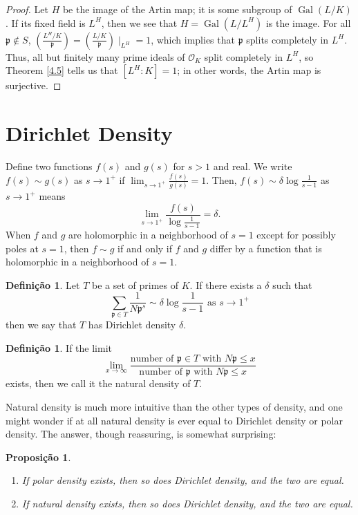 \documentclass{article}
\DeclareMathOperator{\Gal}{Gal}
\theoremstyle{plain}
\newtheorem{prop}[thm]{Proposição}
\theoremstyle{definition}
\newtheorem{defn}[thm]{Definição}
\theoremstyle{remark}
\numberwithin{equation}{section}
\numberwithin{thm}{section}
\begin{document}
\begin{proof}
Let $H$ be the image of the Artin map; it is some subgroup of $\Gal(L/K)$. If its fixed field is $L^{H}$, then we see that $H = \Gal(L/L^{H})$ is the image. For all $\mathfrak{p} \not\in S$, $\left(\frac{L^{H}/K}{\mathfrak{p}}\right) = \left(\frac{L/K}{\mathfrak{p}}\right) \mid_{L^{H}} = 1$, which implies that $\mathfrak{p}$ splits completely in $L^{H}$. Thus, all but finitely many prime ideals of $\mathcal{O}_K$ split completely in $L^{H}$, so Theorem \ref{4.5} tells us that $[L^{H} : K] = 1$; in other words, the Artin map is surjective. 
\end{proof}


\section{Dirichlet Density}

Define two functions $f(s)$ and $g(s)$ for $s > 1$ and real. We write $f(s) \sim g(s)$ as $s \to 1^{+}$ if $\lim_{s \to 1^{+}} \frac{f(s)}{g(s)} = 1$. Then, $f(s) \sim \delta\log\frac{1}{s - 1}$ as $s \to 1^{+}$ means $$\lim_{s \to 1^{+}} \frac{f(s)}{\log \frac{1}{s - 1}} = \delta.$$ When $f$ and $g$ are holomorphic in a neighborhood of $s = 1$ except for possibly poles at $s = 1$, then $ f \sim g$ if and only if $f$ and $g$ differ by a function that is holomorphic in a neighborhood of $s = 1$. 

\begin{defn}
Let $T$ be a set of primes of $K$. If there exists a $\delta$ such that $$\sum_{\mathfrak{p} \in T} \frac{1}{N\mathfrak{p}^{s}} \sim \delta\log\frac{1}{s - 1} \text{ as } s \to 1^{+}$$ then we say that $T$ has Dirichlet density $\delta$. 
\end{defn}

\begin{defn}
If the limit $$\lim_{x \to \infty} \frac{\text{number of } \mathfrak{p} \in T \text{ with } N\mathfrak{p} \leq x}{\text{number of } \mathfrak{p} \text{ with } N\mathfrak{p} \leq x}$$ exists, then we call it the natural density of $T$. 
\end{defn}

Natural density is much more intuitive than the other types of density, and one might wonder if at all natural density is ever equal to Dirichlet density or polar density. The answer, though reassuring, is somewhat surprising:

\begin{prop}

$ $ \\ \vspace{-0.4cm} 


\begin{enumerate}

\item If polar density exists, then so does Dirichlet density, and the two are equal.

\item If natural density exists, then so does Dirichlet density, and the two are equal. 

\end{enumerate}

\end{prop}
\end{document}
